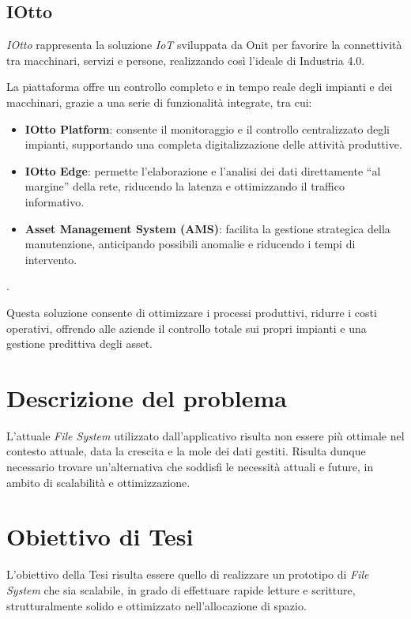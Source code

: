 \documentclass[12pt,a4paper,openright,twoside]{book}
\begin{document}
        \subsection{IOtto}

            \textit{IOtto} rappresenta la soluzione \textit{IoT} sviluppata da Onit per favorire la connettività tra macchinari, servizi e persone, realizzando così l’ideale di Industria 4.0.

            La piattaforma offre un controllo completo e in tempo reale degli impianti e dei macchinari, grazie a una serie di funzionalità integrate, tra cui:
            \begin{itemize}
                \item \textbf{IOtto Platform}: consente il monitoraggio e il controllo centralizzato degli impianti, supportando una completa digitalizzazione delle attività produttive.
                \item \textbf{IOtto Edge}: permette l’elaborazione e l’analisi dei dati direttamente “al margine” della rete, riducendo la latenza e ottimizzando il traffico informativo.
                \item \textbf{Asset Management System (AMS)}: facilita la gestione strategica della manutenzione, anticipando possibili anomalie e riducendo i tempi di intervento.
            \end{itemize}.

            Questa soluzione consente di ottimizzare i processi produttivi, ridurre i costi operativi, offrendo alle aziende il controllo totale sui propri impianti e una gestione predittiva degli asset.

    \section{Descrizione del problema}

        L'attuale \textit{File System} utilizzato dall'applicativo risulta non essere più ottimale nel contesto attuale, data la crescita e la mole dei dati gestiti.
        Risulta dunque necessario trovare un'alternativa che soddisfi le necessità attuali e future, in ambito di scalabilità e ottimizzazione.

    \section{Obiettivo di Tesi}

        L'obiettivo della Tesi risulta essere quello di realizzare un prototipo di \textit{File System} che sia scalabile, in grado di effettuare rapide letture e scritture, strutturalmente solido e ottimizzato nell'allocazione di spazio.
\end{document}
